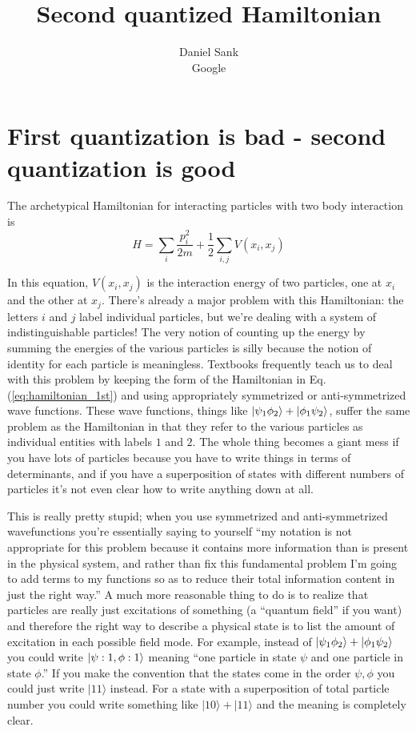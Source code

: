 \documentclass{article}
\title{Second quantized Hamiltonian}
\author{Daniel Sank\\Google}
\begin{document}
\maketitle

\section{First quantization is bad - second quantization is good}

The archetypical Hamiltonian for interacting particles with two body interaction is
\begin{equation}
H = \sum_{i}\frac{p_{i}^{2}}{2m} + \frac{1}{2}\sum_{i,j}V(x_{i},x_{j}) \label{eq:hamiltonian_1st}
\end{equation}

In this equation, $V(x_{i},x_{j})$ is the interaction energy of two particles, one at $x_{i}$ and the other at $x_{j}$.
There's already a major problem with this Hamiltonian: the letters $i$ and $j$ label individual particles, but we're dealing with a system of indistinguishable particles!
The very notion of counting up the energy by summing the energies of the various particles is silly because the notion of identity for each particle is meaningless.
Textbooks frequently teach us to deal with this problem by keeping the form of the Hamiltonian in Eq.\,(\ref{eq:hamiltonian_1st}) and using appropriately symmetrized or anti-symmetrized wave functions.
These wave functions, things like $| \psi_{1}\phi_{2} \rangle+| \phi_{1}\psi_{2} \rangle$, suffer the same problem as the Hamiltonian in that they refer to the various particles as individual entities with labels $1$ and $2$.
The whole thing becomes a giant mess if you have lots of particles because you have to write things in terms of determinants, and if you have a superposition of states with different numbers of particles it's not even clear how to write anything down at all.

This is really pretty stupid; when you use symmetrized and anti-symmetrized wavefunctions you're essentially saying to yourself {}``my notation is not appropriate for this problem because it contains more information than is present in the physical system, and rather than fix this fundamental problem I'm going to add terms to my functions so as to reduce their total information content in just the right way.''
A much more reasonable thing to do is to realize that particles are really just excitations of something (a ``quantum field'' if you want) and therefore the right way to describe a physical state is to list the amount of excitation in each possible field mode.
For example, instead of $| \psi_{1}\phi_{2} \rangle + | \phi_{1}\psi_{2} \rangle$ you could write $| \psi:1,\phi:1 \rangle$ meaning ``one particle in state $\psi$ and one particle in state $\phi$.''
If you make the convention that the states come in the order $\psi,\phi$ you could just write $|11\rangle$ instead.
For a state with a superposition of total particle number you could write something like $|10\rangle+|11\rangle$ and the meaning is completely clear.
\end{document}
